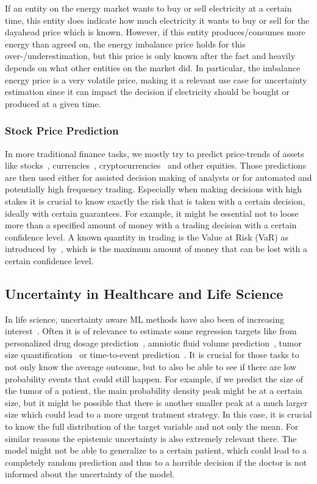 If an entity on the energy market wants to buy or sell electricity at a certain time, this entity does indicate how much electricity it wants to buy or sell for the dayahead price which is known. However, if this entity produces/consumes more energy than agreed on, the energy imbalance price holds for this over-/underestimation, but this price is only known after the fact and heavily depends on what other entities on the market did. In particular, the imbalance energy price is a very volatile price, making it a relevant use case for uncertainty estimation since it can impact the decision if electricity should be bought or produced at a given time.

\subsubsection{Stock Price Prediction}
In more traditional finance tasks, we mostly try to predict price-trends of assets like stocks~\cite{singh2017stock}, currencies~\cite{hassanpour2023evaluation}, cryptocurrencies~\cite{alessandretti2018anticipating} and other equities. Those predictions are then used either for assisted decision making of analysts or for automated and potentially high frequency trading. Especially when making decisions with high stakes it is crucial to know exactly the risk that is taken with a certain decision, ideally with certain guarantees. For example, it might be essential not to loose more than a specified amount of money with a trading decision with a certain confidence level. A known quantity in trading is the Value at Risk (VaR) as introduced by~\cite{jorion2007value}, which is the maximum amount of money that can be lost with a certain confidence level.

\subsection{Uncertainty in Healthcare and Life Science}

In life science, uncertainty aware ML methods have also been of increasing interest~\cite{loftus2022uncertainty, lambert2024trustworthy}. Often it is of relevance to estimate some regression targets like from personalized drug dosage prediction~\cite{wu2023application}, amniotic fluid volume prediction~\cite{csillag2023amnioml}, tumor size quantification~\cite{prasad2023tumor} or time-to-event prediction~\cite{kvamme2019time, sloma2021empirical}. It is crucial for those tasks to not only know the average outcome, but to also be able to see if there are low probability events that could still happen. For example, if we predict the size of the tumor of a patient, the main probability density peak might be at a certain size, but it might be possible that there is another smaller peak at a much larger size which could lead to a more urgent tratment strategy. In this case, it is crucial to know the full distribution of the target variable and not only the mean. For similar reasons the epistemic uncertainty is also extremely relevant there. The model might not be able to generalize to a certain patient, which could lead to a completely random prediction and thus to a horrible decision if the doctor is not informed about the uncertainty of the model.

